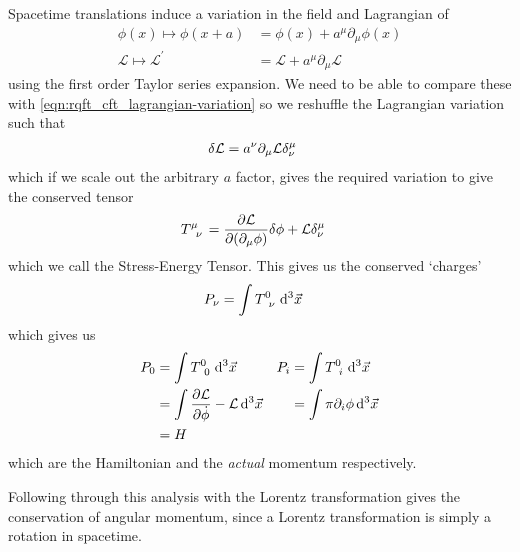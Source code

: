 \documentclass[notes.tex]{subfiles}
\begin{document}
Spacetime translations induce a variation in the field and Lagrangian of
\begin{align*}
  \phi(x) \mapsto \phi(x+a) &= \phi(x) + a^\mu \partial_\mu \phi(x)\\
  \mathcal{L} \mapsto \mathcal{L}^\prime &= \mathcal{L} + a^\mu \partial_\mu \mathcal{L}
\end{align*}
using the first order Taylor series expansion.
We need to be able to compare these with \autoref{eqn:rqft_cft_lagrangian-variation} so we reshuffle the Lagrangian variation such that
\begin{align*}
  \var\mathcal{L} &= a^\nu\partial_\mu \mathcal{L}\delta^\mu_\nu
\end{align*}
which if we scale out the arbitrary $a$ factor, gives the required variation to give the conserved tensor
\begin{align*}
  \tensor{T}{^\mu_\nu} &= \pdv{\mathcal{L}}{(\partial_\mu\phi)} \var\phi + \mathcal{L}\delta^\mu_\nu
\end{align*}
which we call the Stress-Energy Tensor.
This gives us the conserved `charges'
\begin{align*}
  P_\nu &= \int \tensor{T}{^0_\nu} \dd[3]{\vec{x}}
\end{align*}
which gives us 
\begin{align*}
  P_0 &= \int \tensor{T}{^0_0} \dd[3]{\vec{x}} & P_i &= \int \tensor{T}{^0_i} \dd[3]{\vec{x}}\\
  &= \int \pdv{\mathcal{L}}{\dot\phi} - \mathcal{L} \dd[3]{\vec{x}}& &=\int \pi \partial_i \phi \dd[3]{\vec{x}} \\
  &= H
\end{align*}
which are the Hamiltonian and the \emph{actual} momentum respectively. 

Following through this analysis with the Lorentz transformation gives the conservation of angular momentum, since a Lorentz transformation is simply a rotation in spacetime.
\end{document}
